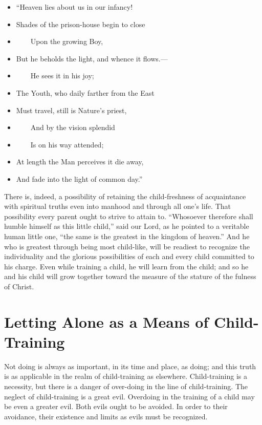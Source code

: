 \documentclass[
]{book}
\providecommand{\tightlist}{%
  \setlength{\itemsep}{0pt}\setlength{\parskip}{0pt}}
\begin{document}
\begin{itemize}
\tightlist
\item
  ``Heaven lies about us in our infancy!
\item
  Shades of the prison-house begin to close
\item
  ~~~~Upon the growing Boy,
\item
  But he beholds the light, and whence it flows.---
\item
  ~~~~He sees it in his joy;
\item
  The Youth, who daily farther from the East
\item
  Must travel, still is Nature's priest,
\item
  ~~~~And by the vision splendid
\item
  ~~~~Is on his way attended;
\item
  At length the Man perceives it die away,
\item
  And fade into the light of common day.''
\end{itemize}

There is, indeed, a possibility of retaining the child-freshness of acquaintance with spiritual truths even into manhood and through all one's life. That possibility every parent ought to strive to attain to. ``Whosoever therefore shall humble himself as this little child,'' said our Lord, as he pointed to a veritable human little one, ``the same is the greatest in the kingdom of heaven.'' And he who is greatest through being most child-like, will be readiest to recognize the individuality and the glorious possibilities of each and every child committed to his charge. Even while training a child, he will learn from the child; and so he and his child will grow together toward the measure of the stature of the fulness of Christ.

\hypertarget{letting-alone-as-a-means-of-child-training}{%
\chapter{Letting Alone as a Means of Child-Training}\label{letting-alone-as-a-means-of-child-training}}

Not doing is always as important, in its time and place, as doing; and this truth is as applicable in the realm of child-training as elsewhere. Child-training is a necessity, but there is a danger of over-doing in the line of child-training. The neglect of child-training is a great evil. Overdoing in the training of a child may be even a greater evil. Both evils ought to be avoided. In order to their avoidance, their existence and limits as evils must be recognized.
\end{document}
